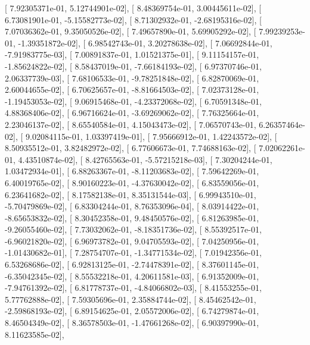 \documentclass{article}
\begin{document}
       [  7.92305371e-01,   5.12744901e-02],
       [  8.48369754e-01,   3.00445611e-02],
       [  6.73081901e-01,  -5.15582773e-02],
       [  8.71302932e-01,  -2.68195316e-02],
       [  7.07036362e-01,   9.35050526e-02],
       [  7.49657890e-01,   5.69905292e-02],
       [  7.99239253e-01,  -1.39351872e-02],
       [  6.98542743e-01,   3.20278638e-02],
       [  7.06692844e-01,  -7.91983775e-03],
       [  7.00891837e-01,   1.01521375e-01],
       [  9.11154157e-01,  -1.85624822e-02],
       [  8.58437019e-01,  -7.66184193e-02],
       [  6.97370746e-01,   2.06337739e-03],
       [  7.68106533e-01,  -9.78251848e-02],
       [  6.82870069e-01,   2.60044655e-02],
       [  6.70625657e-01,  -8.81664503e-02],
       [  7.02373128e-01,  -1.19453053e-02],
       [  9.06915468e-01,  -4.23372068e-02],
       [  6.70591348e-01,   4.88368406e-02],
       [  6.96716624e-01,  -3.69269062e-02],
       [  7.76325664e-01,   2.23046137e-02],
       [  8.65540584e-01,   4.15043473e-02],
       [  7.06570743e-01,   6.26357464e-02],
       [  9.02084115e-01,   1.03397419e-01],
       [  7.95666912e-01,   1.42243572e-02],
       [  8.50935512e-01,   3.82482972e-02],
       [  6.77606673e-01,   7.74688163e-02],
       [  7.02062261e-01,   4.43510874e-02],
       [  8.42765563e-01,  -5.57215218e-03],
       [  7.30204244e-01,   1.03472934e-01],
       [  6.88263367e-01,  -8.11203683e-02],
       [  7.59642269e-01,   6.40019765e-02],
       [  8.90160223e-01,  -4.37630042e-02],
       [  6.83559056e-01,   6.23641682e-02],
       [  8.17582138e-01,   8.35131544e-03],
       [  6.99943510e-01,  -5.70479869e-02],
       [  6.83304244e-01,   8.76353096e-04],
       [  8.03914422e-01,  -8.65653832e-02],
       [  8.30452358e-01,   9.48450576e-02],
       [  6.81263985e-01,  -9.26055460e-02],
       [  7.73032062e-01,  -8.18351736e-02],
       [  8.55392517e-01,  -6.96021820e-02],
       [  6.96973782e-01,   9.04705593e-02],
       [  7.04250956e-01,  -1.01430682e-01],
       [  7.28754707e-01,  -1.34771534e-02],
       [  7.01942356e-01,   6.53268686e-02],
       [  6.92813125e-01,  -2.74478391e-02],
       [  8.37601145e-01,  -6.35042345e-02],
       [  8.55532218e-01,   4.20611581e-03],
       [  6.91352009e-01,  -7.94761392e-02],
       [  6.81778737e-01,  -4.84066802e-03],
       [  8.41553255e-01,   5.77762888e-02],
       [  7.59305696e-01,   2.35884744e-02],
       [  8.45462542e-01,  -2.59868193e-02],
       [  6.89154625e-01,   2.05572006e-02],
       [  6.74279874e-01,   8.46504349e-02],
       [  8.36578503e-01,  -1.47661268e-02],
       [  6.90397990e-01,   8.11623585e-02],
\end{document}
